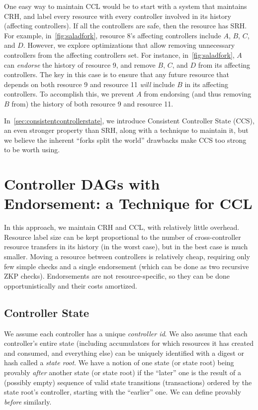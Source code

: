 \documentclass[a4paper,USenglish,cleveref, autoref, thm-restate, anonymous]{lipics-v2021}
\begin{document}
One easy way to maintain CCL would be to start with a system that maintains CRH, and label every resource with every controller involved in its history (affecting controllers). 
If all the controllers are safe, then the resource has SRH. 
For example, in~\cref{fig:saladfork}, resource 8's affecting controllers include $A$, $B$, $C$, and $D$.
However, we explore optimizations that allow removing unnecessary controllers from the affecting controllers set.
For instance, in~\cref{fig:saladfork}, $A$ can \emph{endorse} the history of resource 9, and remove $B$, $C$, and $D$ from its affecting controllers.
The key in this case is to ensure that any future resource that depends on both resource 9 and resource 11 \emph{will} include $B$ in its affecting controllers.
To accomplish this, we prevent $A$ from endorsing (and thus removing $B$ from) the history of both resource 9 and resource 11.

In~\cref{sec:consistentcontrollerstate}, we introduce Consistent Controller State (CCS), an even stronger property than SRH, along with a technique to maintain it, but we believe the inherent ``forks split the world'' drawbacks  make CCS too strong to be worth using.

\section{Controller DAGs with Endorsement: a Technique for CCL}
\label{sec:dagswithendorsement}
In this approach, we maintain CRH and CCL, with relatively little overhead.
Resource label size can be kept proportional to the number of cross-controller resource transfers in its history (in the worst case), but in the best case is much smaller.
Moving a resource between controllers is relatively cheap, requiring only few simple checks and a single endorsement (which can be done as two recursive ZKP checks).
Endorsements are not resource-specific, so they can be done opportunistically and their costs amortized. 

\subsection{Controller State}
We assume each controller has a unique \emph{controller id}.
We also assume that each controller's entire state (including accumulators for which resources it has created and consumed, and everything else) can be uniquely identified with a digest or hash called a \emph{state root}.
We have a notion of one state (or state root) being provably \emph{after} another state (or state root) if the ``later'' one is the result of a (possibly empty) sequence of valid state transitions (transactions) ordered by the state root's controller, starting with the ``earlier'' one. 
We can define provably \emph{before} similarly. 
\end{document}
